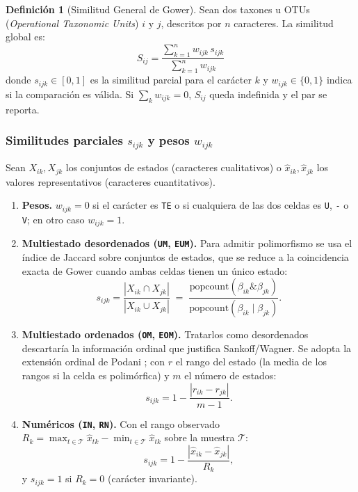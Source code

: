 \documentclass[11pt,a4paper]{article}
\theoremstyle{definition}
\newtheorem{definicion}{Definición}[section]
\theoremstyle{remark}
\begin{document}
\begin{definicion}[Similitud General de Gower]
Sean dos taxones u OTUs (\textit{Operational Taxonomic Units}) $i$ y $j$, descritos por $n$ caracteres. La similitud global es:
\begin{equation}
\label{eq:gower}
S_{ij} = \frac{\sum_{k=1}^n w_{ijk} \, s_{ijk}}{\sum_{k=1}^n w_{ijk}}
\end{equation}
donde $s_{ijk} \in [0, 1]$ es la similitud parcial para el carácter $k$ y $w_{ijk} \in \{0, 1\}$ indica si la comparación es válida. Si $\sum_k w_{ijk} = 0$, $S_{ij}$ queda indefinida y el par se reporta.
\end{definicion}

\subsubsection{Similitudes parciales \texorpdfstring{$s_{ijk}$}{s\_ijk} y pesos \texorpdfstring{$w_{ijk}$}{w\_ijk}}
Sean $X_{ik}, X_{jk}$ los conjuntos de estados (caracteres cualitativos) o $\hat{x}_{ik}, \hat{x}_{jk}$ los valores representativos (caracteres cuantitativos).
\begin{enumerate}
    \item \textbf{Pesos.} $w_{ijk} = 0$ si el carácter es \texttt{TE} o si cualquiera de las dos celdas es \texttt{U}, \texttt{-} o \texttt{V}; en otro caso $w_{ijk} = 1$.
    \item \textbf{Multiestado desordenados (\texttt{UM}, \texttt{EUM}).} Para admitir polimorfismo se usa el índice de Jaccard sobre conjuntos de estados, que se reduce a la coincidencia exacta de Gower cuando ambas celdas tienen un único estado:
    \begin{equation}
    s_{ijk} = \frac{|X_{ik} \cap X_{jk}|}{|X_{ik} \cup X_{jk}|} \;=\; \frac{\mathrm{popcount}(\beta_{ik} \mathbin{\&} \beta_{jk})}{\mathrm{popcount}(\beta_{ik} \mathbin{|} \beta_{jk})}.
    \end{equation}
    \item \textbf{Multiestado ordenados (\texttt{OM}, \texttt{EOM}).} Tratarlos como desordenados descartaría la información ordinal que justifica Sankoff/Wagner. Se adopta la extensión ordinal de Podani \cite{podani1999}; con $r$ el rango del estado (la media de los rangos si la celda es polimórfica) y $m$ el número de estados:
    \begin{equation}
    s_{ijk} = 1 - \frac{|r_{ik} - r_{jk}|}{m - 1}.
    \end{equation}
    \item \textbf{Numéricos (\texttt{IN}, \texttt{RN}).} Con el rango observado $R_k = \max_{t \in \mathcal{T}} \hat{x}_{tk} - \min_{t \in \mathcal{T}} \hat{x}_{tk}$ sobre la muestra $\mathcal{T}$:
    \begin{equation}
    s_{ijk} = 1 - \frac{|\hat{x}_{ik} - \hat{x}_{jk}|}{R_k},
    \end{equation}
    y $s_{ijk} = 1$ si $R_k = 0$ (carácter invariante).
\end{enumerate}
\end{document}
